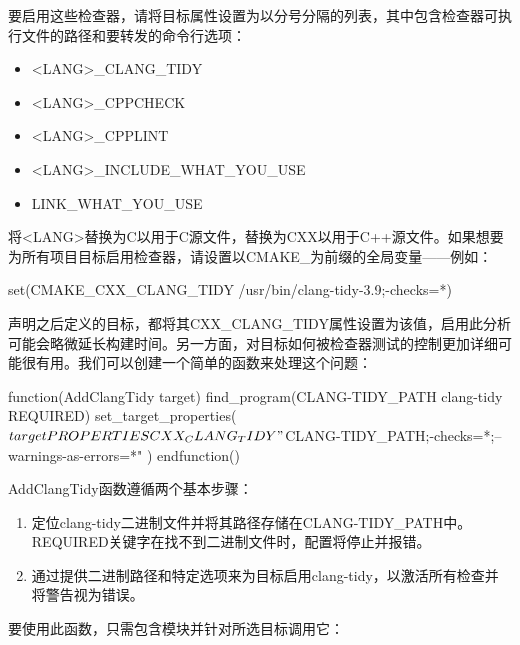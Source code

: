 要启用这些检查器，请将目标属性设置为以分号分隔的列表，其中包含检查器可执行文件的路径和要转发的命令行选项：

\begin{itemize}
\item
<LANG>\_CLANG\_TIDY

\item
<LANG>\_CPPCHECK

\item
<LANG>\_CPPLINT

\item
<LANG>\_INCLUDE\_WHAT\_YOU\_USE

\item
LINK\_WHAT\_YOU\_USE
\end{itemize}

将<LANG>替换为C以用于C源文件，替换为CXX以用于C++源文件。如果想要为所有项目目标启用检查器，请设置以CMAKE\_为前缀的全局变量——例如：

\begin{shell}
set(CMAKE_CXX_CLANG_TIDY /usr/bin/clang-tidy-3.9;-checks=*)
\end{shell}

声明之后定义的目标，都将其CXX\_CLANG\_TIDY属性设置为该值，启用此分析可能会略微延长构建时间。另一方面，对目标如何被检查器测试的控制更加详细可能很有用。我们可以创建一个简单的函数来处理这个问题：


\begin{cmake}
function(AddClangTidy target)
    find_program(CLANG-TIDY_PATH clang-tidy REQUIRED)
    set_target_properties(${target}
        PROPERTIES CXX_CLANG_TIDY
        "${CLANG-TIDY_PATH};-checks=*;--warnings-as-errors=*"
    )
endfunction()
\end{cmake}

AddClangTidy函数遵循两个基本步骤：

\begin{enumerate}
\item
定位clang-tidy二进制文件并将其路径存储在CLANG-TIDY\_PATH中。REQUIRED关键字在找不到二进制文件时，配置将停止并报错。

\item
通过提供二进制路径和特定选项来为目标启用clang-tidy，以激活所有检查并将警告视为错误。
\end{enumerate}

要使用此函数，只需包含模块并针对所选目标调用它：


